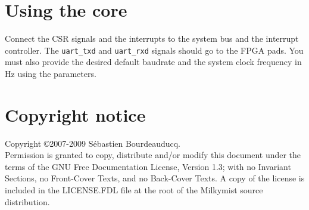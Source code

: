 \documentclass[a4paper,11pt]{article}
\begin{document}
\section{Using the core}
Connect the CSR signals and the interrupts to the system bus and the interrupt controller. The \verb!uart_txd! and \verb!uart_rxd! signals should go to the FPGA pads. You must also provide the desired default baudrate and the system clock frequency in Hz using the parameters.

\section*{Copyright notice}
Copyright \copyright 2007-2009 S\'ebastien Bourdeauducq. \\
Permission is granted to copy, distribute and/or modify this document under the terms of the GNU Free Documentation License, Version 1.3; with no Invariant Sections, no Front-Cover Texts, and no Back-Cover Texts. A copy of the license is included in the LICENSE.FDL file at the root of the Milkymist source distribution.
\end{document}
